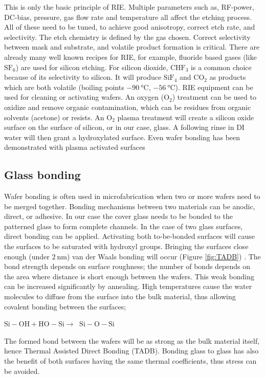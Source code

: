 \documentclass[final]{jyflluk}
\begin{document}
\newpage
This is only the basic principle of RIE. Multiple parameters such as, RF-power, DC-bias, pressure, gas flow rate and temperature all affect the etching process. All of these need to be tuned, to achieve good anisotropy, correct etch rate, and selectivity. The etch chemistry is defined by the gas chosen. Correct selectivity between mask and substrate, and volatile product formation is critical. There are already many well known recipes for RIE, for example, fluoride based gases (like $\mathrm{SF_6}$) are used for silicon etching. For silicon dioxide, $\mathrm{CHF_3}$ is a common choice because of its selectivity to silicon. It will produce $\mathrm{SiF_4}$ and $\mathrm{CO_2}$ as products which are both volatile (boiling points $\SI{-90}{\celsius}$, $\SI{-56}{\celsius}$).  \cite{franssila2010introduction}
RIE equipment can be used for cleaning or activating wafers. An oxygen ($\mathrm{O_2}$) treatment can be used to oxidize and remove organic contamination, which can be residues from organic solvents (acetone) or resists. An $\mathrm{O_2}$ plasma treatment will create a silicon oxide surface on the surface of silicon, or in our case, glass. A following rinse in DI water will then grant a hydroxylated surface. Even wafer bonding has been demonstrated with plasma activated surfaces \cite{plach2013mechanisms,poulsen2003towards}


\subsection{Glass bonding}
\label{sec:xx6}
Wafer bonding is often used in microfabrication when two or more wafers need to be merged together. Bonding mechanisms between two materials can be anodic, direct, or adhesive.  In our case the cover glass needs to be bonded to the patterned glass to form complete channels. In the case of two glass surfaces, direct bonding can be applied. Activating both to-be-bonded surfaces will cause the surfaces to be saturated with hydroxyl groups. Bringing the surfaces close enough (under $\SI{2}{\nano \metre}$) van der Waals bonding will occur (Figure \ref{fig:TADB}) \cite{iliescu2012practical}.  The bond strength depends on surface roughness; the number of bonds depends on the area where distance is short enough between the wafers. This weak bonding can be increased significantly by annealing. High temperatures cause the water molecules to diffuse from the surface into the bulk material, thus allowing covalent bonding between the surfaces;
\vaali
\centerline{$\mathrm{Si-OH + HO-Si \rightarrow \;\; Si-O-Si} $}
\vaali
\noindent The formed bond between the wafers will be as strong as the bulk material itself, hence Thermal Assisted Direct Bonding (TADB). Bonding glass to glass has also the benefit of both surfaces having the same thermal coefficients, thus stress can be avoided. \cite{franssila2010introduction}
\end{document}
